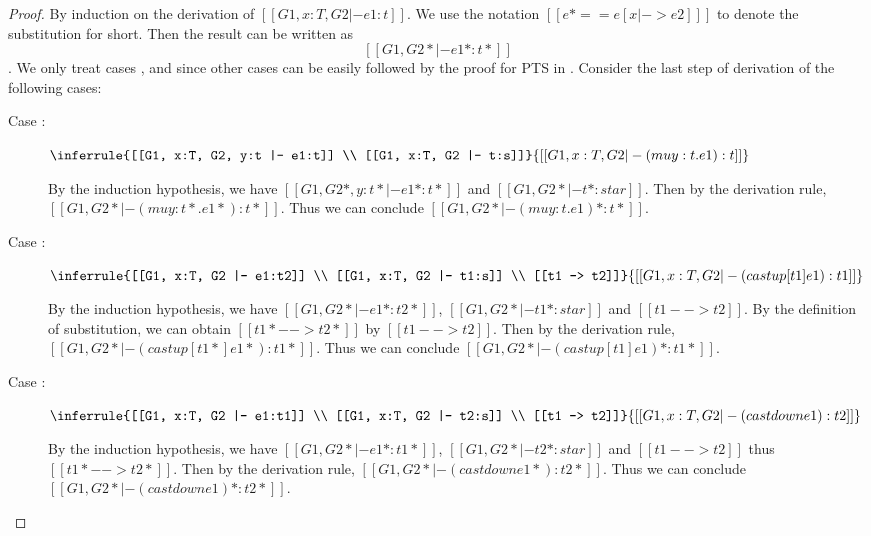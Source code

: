 \begin{proof}
    By induction on the derivation of $[[G1, x:T, G2 |- e1:t]]$. We use the notation $[[e* == e
[x |-> e2] ]]$ to denote the substitution for short. Then the result can be written as \[ [[G1, G2* |- e1*  : t* ]]\].
We only treat cases ,  and
 since other cases can be easily followed by the proof for PTS in \cite{handbook}.
Consider the last step of derivation of the following
cases:
    \begin{description}
        \item[Case :] $\inferrule{[[G1, x:T, G2, y:t |- e1:t]] \\
[[G1, x:T, G2 |- t:s]]}{[[G1, x:T, G2 |- (mu y:t.e1): t]]}$ 
        
        By the induction hypothesis, we have $[[G1, G2*, y:t* |- e1* : t*]]$ and $[[G1,
G2* |- t* : star]]$. Then by the derivation rule, $[[G1, G2* |- (mu
y:t*.e1*):t*]]$. Thus we can conclude $[[G1, G2* |- (mu y:t.e1)*:t*]]$.
        \item[Case :] $\inferrule{[[G1, x:T, G2 |- e1:t2]]
\\ [[G1, x:T, G2 |- t1:s]] \\ [[t1 --> t2]]}{[[G1, x:T, G2 |- (castup [t1]
e1):t1]]}$ 
        
        By the induction hypothesis, we have $[[G1, G2* |- e1*:t2*]]$, $[[G1, G2*
|- t1*:star]]$ and $[[t1 --> t2]]$. By the definition of substitution, we can
obtain $[[t1* --> t2*]]$ by $[[t1 --> t2]]$. Then by the derivation rule, $[[G1,
G2* |- (castup [t1*] e1*):t1*]]$. Thus we can conclude $[[G1, G2* |- (castup [t1]
e1)*:t1*]]$.
        \item[Case :] $\inferrule{[[G1, x:T, G2 |- e1:t1]]
\\ [[G1, x:T, G2 |- t2:s]] \\ [[t1 --> t2]]}{[[G1, x:T, G2 |- (castdown
e1):t2]]}$ 
        
        By the induction hypothesis, we have $[[G1, G2* |- e1*:t1*]]$, $[[G1, G2*
|- t2*:star]]$ and $[[t1 --> t2]]$ thus $[[t1* --> t2*]]$. Then by the
derivation rule, $[[G1, G2* |- (castdown e1*):t2*]]$. Thus we can conclude $[[G1, G2* |-
(castdown e1)*:t2*]]$.
    \end{description}
\end{proof}

